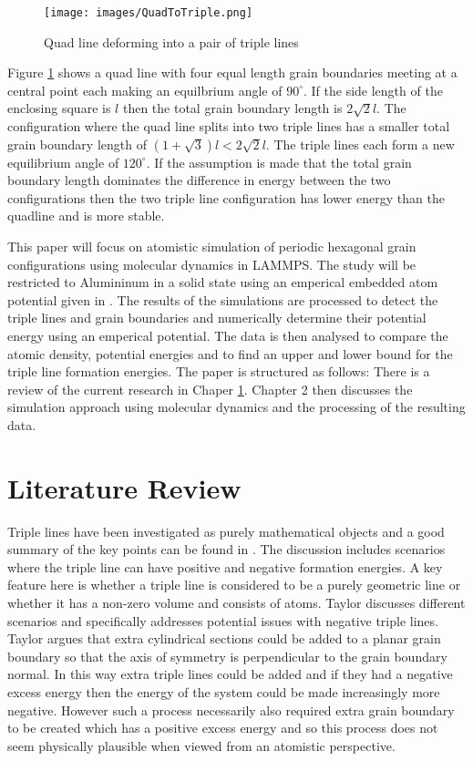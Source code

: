 \documentclass[12pt,a4paper]{book}
\begin{document}
\begin{figure}[H]
	\centering
	\texttt{[image: images/QuadToTriple.png]} 
	\label{fig:QuadToTriple}
	\caption{Quad line deforming into a pair of triple lines}
\end{figure}

Figure \ref{fig:QuadToTriple} shows a quad line with four equal length grain boundaries meeting at a central point each making an equilbrium angle of $90^{\circ}$. If the side length of the enclosing square is $l$ then the total grain boundary length is $2\sqrt{2}l$. The configuration where the quad line splits into two triple lines has a smaller total grain boundary length of $(1 + \sqrt{3})l < 2\sqrt{2}l$. The triple lines each form a new equilibrium angle of $120^{\circ}$. If the assumption is made that the total grain boundary length dominates the difference in energy between the two configurations then the two triple line configuration has lower energy than the quadline and is more stable. 

This paper will focus on atomistic simulation of periodic hexagonal grain configurations using molecular dynamics in LAMMPS. The study will be restricted to Alumininum in a solid state using an emperical embedded atom potential given in \cite{Zope2003}. The results of the simulations are processed to detect the triple lines and grain boundaries and numerically determine their potential energy using an emperical potential. The data is then analysed to compare the atomic density, potential energies and to find an upper and lower bound for the triple line formation energies. The paper is structured as follows: There is a review of the current research in Chaper \ref{ch:1}. Chapter 2 then discusses the simulation approach using molecular dynamics and the processing of the resulting data.   


\chapter{Literature Review} \label{ch:1}

\nocite{*}


 
Triple lines have been investigated as purely mathematical objects and a good summary of the key points can be found in \cite{Taylor1999}. The discussion includes scenarios where the triple line can have positive and negative formation energies. A key feature here is whether a triple line is considered to be a purely geometric line or whether it has a non-zero volume and consists of atoms. Taylor discusses different scenarios and specifically addresses potential issues with negative triple lines. Taylor argues that extra cylindrical sections could be added to a planar grain boundary so that the axis of symmetry is perpendicular to the grain boundary normal. In this way extra triple lines could be added and if they had a negative excess energy then the energy of the system could be made increasingly more negative. However such a process necessarily also required extra grain boundary to be created which has a positive excess energy and so this process does not seem physically plausible when viewed from an atomistic perspective.
\end{document}
